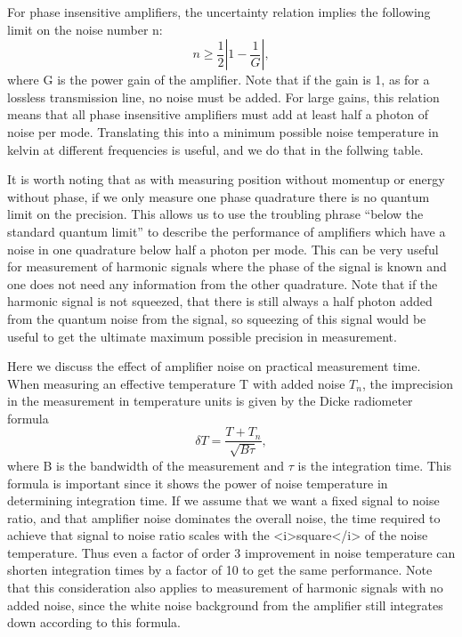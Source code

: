 \documentclass[11pt]{article}
\begin{document}
    	For phase insensitive amplifiers, the uncertainty relation implies the following limit on the noise number n:
$$n\geq \frac{1}{2}\left|1 - \frac{1}{G}\right|,$$
where G is the power gain of the amplifier.  Note that if the gain is 1, as for a lossless transmission line, no noise must be added.  For large gains, this relation means that all phase insensitive amplifiers must add at least half a photon of noise per mode.  Translating this into a minimum possible noise temperature in kelvin at different frequencies is useful, and we do that in the follwing table.  





    It is worth noting that as with measuring position without momentup or energy without phase, if we only measure one phase quadrature there is no quantum limit on the precision.  This allows us to use the troubling phrase ``below the standard quantum limit'' to describe the performance of amplifiers which have a noise in one quadrature below half a photon per mode.  This can be very useful for measurement of harmonic signals where the phase of the signal is known and one does not need any information from the other quadrature.  Note that if the harmonic signal is not squeezed, that there is still always a half photon added from the quantum noise from the signal, so squeezing of this signal would be useful to get the ultimate maximum possible precision in measurement.  




    	Here we discuss the effect of amplifier noise on practical measurement time.  When measuring an effective temperature T with added noise $T_n$, the imprecision in the measurement in temperature units is given by the Dicke radiometer formula
$$\delta T = \frac{T + T_n}{\sqrt{B\tau}},$$
where B is the bandwidth of the measurement and $\tau$ is the integration time.  This formula is important since it shows the power of noise temperature in determining integration time.  If we assume that we want a fixed signal to noise ratio, and that amplifier noise dominates the overall noise, the time required to achieve that signal to noise ratio scales with the <i>square</i> of the noise temperature.  Thus even a factor of order 3 improvement in noise temperature can shorten integration times by a factor of 10 to get the same performance.  Note that this consideration also applies to measurement of harmonic signals with no added noise, since the white noise background from the amplifier still integrates down according to this formula.  
\end{document}
